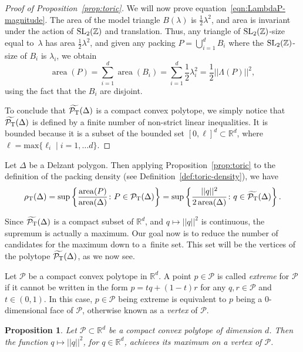 \documentclass[10pt,a4paper]{amsart}
\numberwithin{equation}{section}
\newtheorem{Proposition}[Theorem]{Proposition}
\def\R{{\mathbb R}}
\def\Z{{\mathbb Z}}
\newcommand{\De}{\Delta}
\newcommand{\area}{\operatorname{area}}
\newcommand{\PT}{\mathcal{P}_{\rm T}}
\newcommand{\PTtilde}{\widetilde{\PT}}
\newcommand{\SL}{{\rm SL}_2(\Z)}
\theoremstyle{definition}
\theoremstyle{plain}
\theoremstyle{plain}
\begin{document}
\begin{proof}[Proof of Proposition~\ref{prop:toric}]
We will now prove equation~\eqref{eqn:LambdaP-magnitude}.
The area of the model triangle $B(\lambda)$ is $\frac{1}{2}\lambda^2$, and area is invariant under the action of $\SL$ and translation.
Thus, any triangle of $\SL$-size equal to~$\lambda$ has area $\frac{1}{2}\lambda^2$,
and given any packing $P = \bigcup_{i=1}^d B_i$ where the $\SL$-size of $B_i$ is $\lambda_i$, we obtain
\[
 \area(P) = \sum_{i=1}^d \area(B_i) = \sum_{i=1}^d \frac{1}{2} \lambda_i^2 = \frac{1}{2} || \Lambda(P) ||^2,
\]
using the fact that the $B_i$ are disjoint.


To conclude that $\PTtilde(\De)$ is a compact convex polytope, we simply notice that $\PTtilde(\De)$ is defined by a finite number of non-strict linear inequalities. It is bounded because it is a subset of the bounded set $[0,\ell]^d\subset \R^d$, where $\ell = \mathrm{max}\{ \ell_i \mid i = 1,\ldots d\}$.
\end{proof}

Let $\De$ be a Delzant polygon. Then applying Proposition~\ref{prop:toric} to the definition of the packing density (see Definition~\ref{def:toric-density}), we have
\[
 \rho_{{\rm T}}(\De) = \sup \left\{ \frac{\area(P)}{\area(\De)}\colon  P \in \PT(\De) \right\} = \sup \left\{ \frac{||q||^2}{2 \area(\De)}\colon  q \in \PTtilde(\De) \right\}.
\]

Since $\PTtilde(\De)$ is a compact subset of $\R^d$, and $q\mapsto ||q||^2$ is continuous, the supremum is actually a maximum. Our goal now is to reduce the number of candidates for the maximum down to a~finite set. This set will be the vertices of the polytope $\PTtilde(\De)$, as we now see.

Let $\mathcal{P}$ be a compact convex polytope in $\R^d$. A point $p\in\mathcal{P}$ is called \emph{extreme} for $\mathcal{P}$ if it cannot be written in the form $ p = t q + (1- t) r$ for any $q,r \in \mathcal{P}$ and $t \in (0,1)$. In this case, $p\in\mathcal{P}$ being extreme is equivalent to $p$ being a $0$-dimensional face of $\mathcal{P}$, otherwise known as a \emph{vertex} of $\mathcal{P}$.

\begin{Proposition}
\label{prop:vert}
 Let $\mathcal{P}\subset \R^d$ be a compact convex polytope of dimension $d$. Then the function $q\mapsto ||q||^2$, for $q\in\R^d$, achieves its maximum on a vertex of $\mathcal{P}$.
\end{Proposition}
\end{document}

